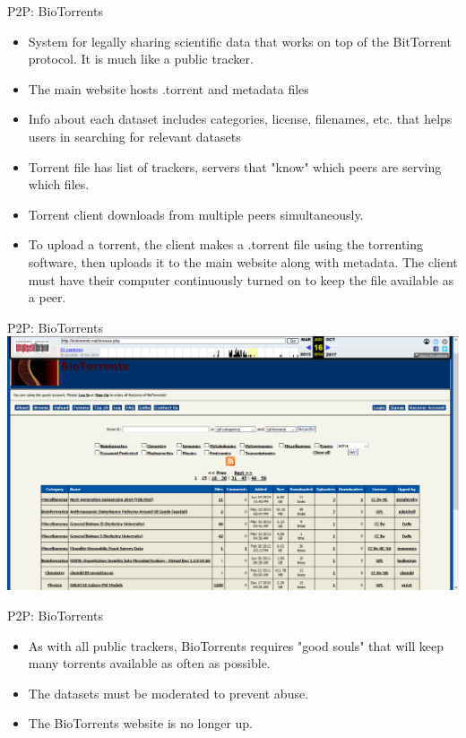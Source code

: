 \documentclass{beamer}
\begin{document}
    \begin{frame}{P2P: BioTorrents}
        \begin{itemize}
        \item System for legally sharing scientific data that works on top of the BitTorrent protocol. It is much like a public tracker.
        \item The main website hosts .torrent and metadata files
        \item Info about each dataset includes categories, license, filenames, etc. that helps users in searching for relevant datasets
        \item Torrent file has list of trackers, servers that "know" which peers are serving which files.
        \item Torrent client downloads from multiple peers simultaneously.
        \item To upload a torrent, the client makes a .torrent file using the torrenting software, then uploads it to the main website along with metadata. The client must have their computer continuously turned on to keep the file available as a peer. \cite{biotorrents}
        \end{itemize}
    \end{frame}
    
    \begin{frame}{P2P: BioTorrents}
        \includegraphics[scale=0.33]{biotorrents-page.png}
    \end{frame}
    
    \begin{frame}{P2P: BioTorrents}
        \begin{itemize}
            \item As with all public trackers, BioTorrents requires "good souls" that will keep many torrents available as often as possible.
            \item The datasets must be moderated to prevent abuse.
            \item The BioTorrents website is no longer up.
        \end{itemize}
    \end{frame}
 
\end{document}
